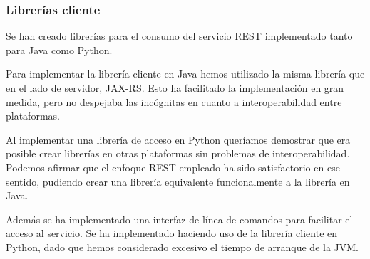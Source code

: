%
%

\subsubsection{Librerías cliente}

Se han creado librerías para el consumo del servicio REST implementado
tanto para Java como Python.

Para implementar la librería cliente en Java hemos utilizado la misma
librería que en el lado de servidor, JAX-RS. Esto ha facilitado la
implementación en gran medida, pero no despejaba las incógnitas en
cuanto a interoperabilidad entre plataformas.

Al implementar una librería de acceso en Python queríamos demostrar
que era posible crear librerías en otras plataformas sin problemas de
interoperabilidad. Podemos afirmar que el enfoque REST empleado ha
sido satisfactorio en ese sentido, pudiendo crear una librería
equivalente funcionalmente a la librería en Java.

Además se ha implementado una interfaz de línea de comandos para
facilitar el acceso al servicio. Se ha implementado haciendo uso de la
librería cliente en Python, dado que hemos considerado excesivo el
tiempo de arranque de la JVM.

